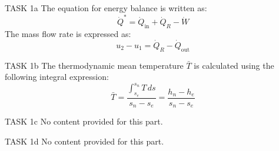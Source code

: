 TASK 1a  
The equation for energy balance is written as:  
\[
\dot{Q}^* = \dot{Q}_{\text{in}} + \dot{Q}_R - \dot{W}
\]  
The mass flow rate is expressed as:  
\[
u_2 - u_1 = \dot{Q}_R - \dot{Q}_{\text{out}}
\]  

TASK 1b  
The thermodynamic mean temperature \( \bar{T} \) is calculated using the following integral expression:  
\[
\bar{T} = \frac{\int_{s_e}^{s_n} T \, ds}{s_n - s_e} = \frac{h_n - h_e}{s_n - s_e}
\]  

TASK 1c  
No content provided for this part.  

TASK 1d  
No content provided for this part.  